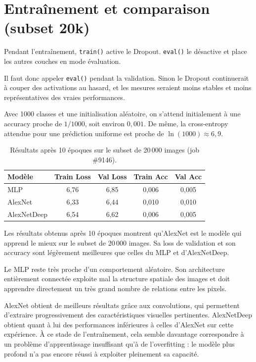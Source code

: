 \documentclass[11pt,a4paper]{article}
\begin{document}
\section{Entraînement et comparaison (subset 20k)}

Pendant l'entraînement, \texttt{train()} active le Dropout.
\texttt{eval()} le désactive et place les autres couches en mode évaluation.

Il faut donc appeler \texttt{eval()} pendant la validation. Sinon le Dropout
continuerait à couper des activations au hasard, et les mesures seraient moins
stables et moins représentatives des vraies performances.

Avec 1000 classes et une initialisation aléatoire, on s'attend initialement à une
accuracy proche de $1/1000$, soit environ $0{,}001$. De même, la cross-entropy
attendue pour une prédiction uniforme est proche de $\ln(1000)\approx6{,}9$.

\begin{table}[H]
\centering
\small
\caption{Résultats après 10 époques sur le subset de 20\,000 images (job \#9146).}
\begin{tabular}{@{}lcccc@{}}
\toprule
Modèle & Train Loss & Val Loss & Train Acc & Val Acc \\
\midrule
MLP & 6,76 & 6,85 & 0,006 & 0,005 \\
AlexNet & 6,33 & 6,44 & 0,010 & 0,010 \\
AlexNetDeep & 6,54 & 6,62 & 0,006 & 0,005 \\
\bottomrule
\end{tabular}
\end{table}

Les résultats obtenus après 10 époques montrent qu'AlexNet est le modèle qui apprend
le mieux sur le subset de 20\,000 images. Sa loss de validation et son accuracy sont
légèrement meilleures que celles du MLP et d'AlexNetDeep.

Le MLP reste très proche d'un comportement aléatoire. Son architecture entièrement
connectée exploite mal la structure spatiale des images et doit apprendre directement
un très grand nombre de relations entre les pixels.

AlexNet obtient de meilleurs résultats grâce aux convolutions, qui permettent
d'extraire progressivement des caractéristiques visuelles pertinentes. AlexNetDeep
obtient quant à lui des performances inférieures à celles d'AlexNet sur cette
expérience. À ce stade de l'entraînement, cela semble davantage correspondre à un
problème d'apprentissage insuffisant qu'à de l'overfitting : le modèle plus profond
n'a pas encore réussi à exploiter pleinement sa capacité.
\end{document}
